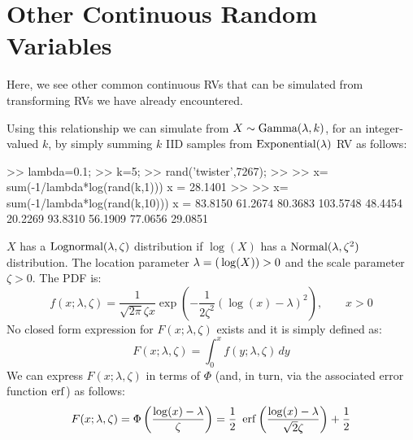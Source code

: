 \section{Other Continuous Random Variables}\label{S:OtherContRVs}
Here, we see other common continuous RVs that can be simulated from transforming RVs we have already encountered.
\begin{simulation}\label{SIM:Gamma}
Using this relationship we can simulate from $X \sim \mbox{{\rm Gamma}}(\lambda,k)$, for an integer-valued $k$, by simply summing $k$ IID samples from $\mbox{{\rm Exponential}}(\lambda)$ RV as follows:
\begin{VrbM}
>> lambda=0.1; %
>> k=5; %
>> rand('twister',7267); %
>> %
>> x= sum(-1/lambda*log(rand(k,1)))
x =   28.1401
>> %
>> x= sum(-1/lambda*log(rand(k,10)))
x =
   83.8150   61.2674   80.3683  103.5748   48.4454   20.2269   93.8310   56.1909   77.0656   29.0851
\end{VrbM}
\end{simulation}

\begin{model}[$\lognormal(\lambda,\zeta)$]
$X$ has a $\lognormal(\lambda,\zeta) $ distribution if $\log(X)$ has a $\mbox{{\rm Normal}}(\lambda,\zeta^2)$ distribution.  The location parameter $\lambda = \mathscr{(}\log(X)) > 0$ and the scale parameter $\zeta > 0$.  The PDF is:
\begin{equation}\label{E:LogNormalpdf}
f(x; \lambda, \zeta) = \frac{1}{\sqrt{2 \pi} \zeta x }
 \exp{\left( - \frac{1}{2 \zeta^2} (\log(x)-\lambda)^2 \right)}, \qquad x > 0
\end{equation}
No closed form expression for $F(x;\lambda,\zeta)$ exists and it is simply defined as:
\[
F(x;\lambda,\zeta) = \int_{0}^x f (y;\lambda,\zeta)\,dy
\]
We can express $F(x;\lambda,\zeta) $ in terms of $\Phi$ (and, in turn, via the associated  error function $\operatorname{erf}$) as follows:
\begin{equation}\label{E:DFLogNormalviaErf}
F(x;\lambda,\zeta) = \Phi \left( \frac{\log(x) - \lambda}{\zeta} \right) = \frac{1}{2} \ \operatorname{erf} \left(  \frac{\log(x)-\lambda}{\sqrt{2}\zeta} \right)+ \frac{1}{2}
\end{equation}
\end{model}

